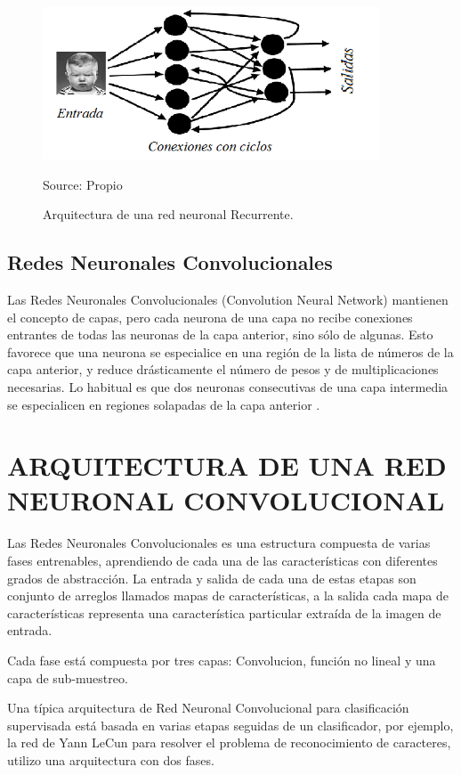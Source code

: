 \begin{figure}[H]
		\centering
		\includegraphics[width=100mm]{./Imagenes/red_recurrente.png}
		\caption{Arquitectura de una red neuronal Recurrente.}
		Source: Propio
		\label{fig:red_recurrente}
\end{figure}

\subsection{Redes Neuronales Convolucionales}
Las Redes Neuronales Convolucionales (Convolution Neural Network) mantienen
el concepto de capas, pero cada neurona de una capa no recibe conexiones entrantes de
todas las neuronas de la capa anterior, sino sólo de algunas. Esto favorece que una neurona
se especialice en una región de la lista de números de la capa anterior, y reduce
drásticamente el número de pesos y de multiplicaciones necesarias. Lo habitual es que
dos neuronas consecutivas de una capa intermedia se especialicen en regiones solapadas
de la capa anterior \cite{16pusiol2014redes}.

\section{ARQUITECTURA DE UNA RED NEURONAL
CONVOLUCIONAL}

Las Redes Neuronales Convolucionales es una estructura compuesta de varias
fases entrenables, aprendiendo de cada una de las características con diferentes grados de
abstracción. La entrada y salida de cada una de estas etapas son conjunto de arreglos
llamados mapas de características, a la salida cada mapa de características representa una
característica particular extraída de la imagen de entrada.

Cada fase está compuesta por tres capas: Convolucion, función no lineal y una
capa de sub-muestreo.

Una típica arquitectura de Red Neuronal Convolucional para clasificación
supervisada está basada en varias etapas seguidas de un clasificador, por ejemplo, la red
de Yann LeCun para resolver el problema de reconocimiento de caracteres, utilizo una
arquitectura con dos fases.


